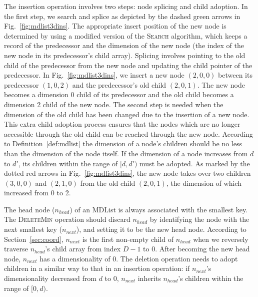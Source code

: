 \documentclass[10pt,journal,letter,compsoc]{IEEEtran}
\begin{document}
The insertion operation involves two steps: node splicing and child adoption.
In the first step, we search and splice as depicted by the dashed green arrows in Fig.~\ref{fig:mdlist3dins}.
The appropriate insert position of the new node is determined by using a modified version of the \textsc{Search} algorithm, which keeps a record of the predecessor and the dimension of the new node (the index of the new node in its predecessor's child array).
Splicing involves pointing to the old child of the predecessor from the new node and updating the child pointer of the predecessor.
In Fig.~\ref{fig:mdlist3dins}, we insert a new node $(2,0,0)$ between its predecessor $(1,0,2)$ and the predecessor's old child $(2,0,1)$.
The new node becomes a dimension 0 child of its predecessor and the old child becomes a dimension 2 child of the new node.
The second step is needed when the dimension of the old child has been changed due to the insertion of a new node.
This extra child adoption process ensures that the nodes which are no longer accessible through the old child can be reached through the new node.
According to Definition~\ref{def:mdlist} the dimension of a node's children should be no less than the dimension of the node itself.
If the dimension of a node increases from $d$ to $d'$, its children within the range of $[d,d')$ must be adopted.
As marked by the dotted red arrows in Fig.~\ref{fig:mdlist3dins}, the new node takes over two children $(3,0,0)$ and $(2,1,0)$ from the old child $(2,0,1)$, the dimension of which increased from 0 to 2. 

The head node ($n_{head}$) of an MDList is always associated with the smallest key.
The \textsc{DeleteMin} operation should discard $n_{head}$ by identifying the node with the next smallest key ($n_{next}$), and setting it to be the new head node.
According to Section~\ref{sec:coord}, $n_{next}$ is the first non-empty child of $n_{head}$ when we reversely traverse $n_{head}$'s child array from index $D-1$ to $0$.
After becoming the new head node, $n_{next}$ has a dimensionality of $0$.
The deletion operation needs to adopt children in a similar way to that in an insertion operation: if $n_{next}$'s dimensionality decreased from $d$ to $0$, $n_{next}$ inherits $n_{head}$'s children within the range of $[0,d)$.

\end{document}
